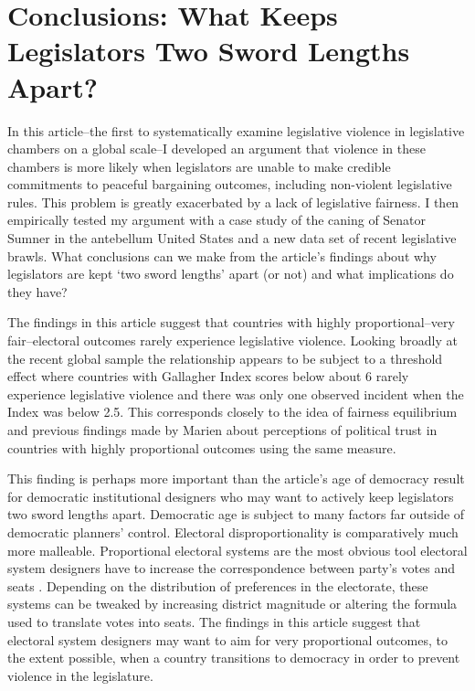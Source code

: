 \documentclass[a4paper]{article}\usepackage[]{graphicx}\usepackage[]{color}
\begin{document}
\section*{Conclusions: What Keeps Legislators Two Sword Lengths Apart?}

In this article--the first to systematically examine legislative violence in  legislative chambers on a global scale--I developed an argument that violence in these chambers is more likely when legislators are unable to make credible commitments to peaceful bargaining outcomes, including non-violent legislative rules. This problem is greatly exacerbated by a lack of legislative fairness. I then empirically tested my argument with a case study of the caning of Senator Sumner in the antebellum United States and a new data set of recent legislative brawls. What conclusions can we make from the article's findings about why legislators are kept `two sword lengths' apart (or not) and what implications do they have?

The findings in this article suggest that countries with highly proportional--very fair--electoral outcomes rarely experience legislative violence. Looking broadly at the recent global sample the relationship appears to be subject to a threshold effect where countries with Gallagher Index scores below about 6 rarely experience legislative violence and there was only one observed incident when the Index was below 2.5. This corresponds closely to the idea of fairness equilibrium and previous findings made by Marien \citeyearpar{Marien2011} about perceptions of political trust in countries with highly proportional outcomes using the same measure.

This finding is perhaps more important than the article's age of democracy result for democratic institutional designers who may want to actively keep legislators two sword lengths apart. Democratic age is subject to many factors far outside of democratic planners' control. Electoral disproportionality is comparatively much more malleable. Proportional electoral systems are the most obvious tool electoral system designers have to increase the correspondence between party's votes and seats \citep{Carey2011}. Depending on the distribution of preferences in the electorate, these systems can be tweaked by increasing district magnitude or altering the formula used to translate votes into seats. The findings in this article suggest that electoral system designers may want to aim for very proportional outcomes, to the extent possible, when a country transitions to democracy in order to prevent violence in the legislature.
\end{document}
